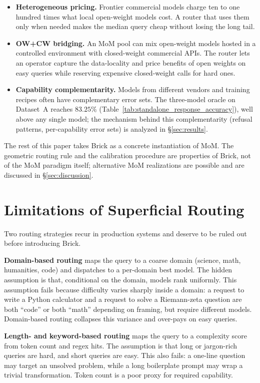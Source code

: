 \documentclass[twocolumn,10pt,a4paper]{article}
\begin{document}
\begin{itemize}\setlength{\itemsep}{3pt}
  \item \textbf{Heterogeneous pricing.} Frontier commercial models charge ten to one hundred times what local open-weight models cost. A router that uses them only when needed makes the median query cheap without losing the long tail.
  \item \textbf{OW+CW bridging.} An MoM pool can mix open-weight models hosted in a controlled environment with closed-weight commercial APIs. The router lets an operator capture the data-locality and price benefits of open weights on easy queries while reserving expensive closed-weight calls for hard ones.
  \item \textbf{Capability complementarity.} Models from different vendors and training recipes often have complementary error sets. The three-model oracle on Dataset~A reaches $83.25\%$ (Table~\ref{tab:standalone_response_accuracy}), well above any single model; the mechanism behind this complementarity (refusal patterns, per-capability error sets) is analyzed in §\ref{sec:results}.
\end{itemize}

The rest of this paper takes Brick as a concrete instantiation of MoM. The geometric routing rule and the calibration procedure are properties of Brick, not of the MoM paradigm itself; alternative MoM realizations are possible and are discussed in §\ref{sec:discussion}.

\section{Limitations of Superficial Routing}\label{sec:superficial}
Two routing strategies recur in production systems and deserve to be ruled out before introducing Brick.

\textbf{Domain-based routing} maps the query to a coarse domain (science, math, humanities, code) and dispatches to a per-domain best model. The hidden assumption is that, conditional on the domain, models rank uniformly. This assumption fails because difficulty varies sharply inside a domain: a request to write a Python calculator and a request to solve a Riemann-zeta question are both ``code'' or both ``math'' depending on framing, but require different models. Domain-based routing collapses this variance and over-pays on easy queries.

\textbf{Length- and keyword-based routing} maps the query to a complexity score from token count and regex hits. The assumption is that long or jargon-rich queries are hard, and short queries are easy. This also fails: a one-line question may target an unsolved problem, while a long boilerplate prompt may wrap a trivial transformation. Token count is a poor proxy for required capability.
\end{document}
